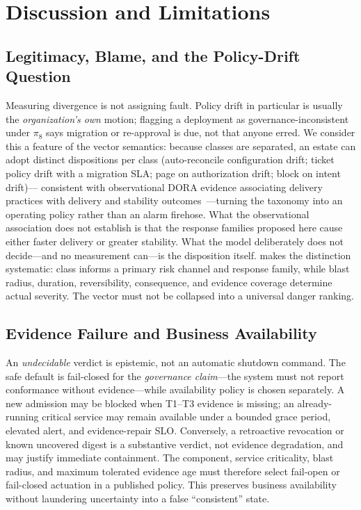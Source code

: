 \section{Discussion and Limitations}
\label{sec:discussion}

\subsection{Legitimacy, Blame, and the Policy-Drift Question}
Measuring divergence is not assigning fault. Policy drift in particular is
usually the \emph{organization's own} motion; flagging a deployment as
governance-inconsistent under $\pi_8$ says migration or re-approval is due,
not that anyone erred. We consider this a feature of the vector semantics:
because classes are separated, an estate can adopt distinct dispositions per
class (auto-reconcile configuration drift; ticket policy drift with a
migration SLA; page on authorization drift; block on intent drift)---%
consistent with observational DORA evidence associating delivery practices
with delivery and stability outcomes~\cite{forsgren2018,dora2019}---turning
the taxonomy into an operating policy rather than an alarm firehose. What the
observational association does not establish is that the response families
proposed here cause either faster delivery or greater stability. What the
model deliberately does not decide---and no measurement can---is the
disposition itself.  makes the distinction systematic:
class informs a primary risk channel and response family, while blast radius,
duration, reversibility, consequence, and evidence coverage determine actual
severity. The vector must not be collapsed into a universal danger ranking.

\subsection{Evidence Failure and Business Availability}
An \emph{undecidable} verdict is epistemic, not an automatic shutdown command.
The safe default is fail-closed for the \emph{governance claim}---the system
must not report conformance without evidence---while availability policy is
chosen separately. A new admission may be blocked when T1--T3 evidence is
missing; an already-running critical service may remain available under a
bounded grace period, elevated alert, and evidence-repair SLO. Conversely, a
retroactive revocation or known uncovered digest is a substantive verdict,
not evidence degradation, and may justify immediate containment. The
component, service criticality, blast radius, and maximum tolerated evidence
age must therefore select fail-open or fail-closed actuation in a published
policy. This preserves business availability without laundering uncertainty
into a false ``consistent'' state.

